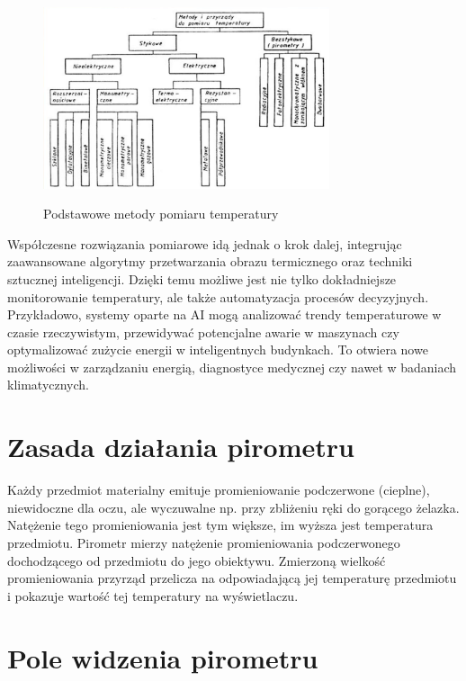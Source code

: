 \vspace{12pt}

\begin{figure}[h!]
    \centering
    \includegraphics[width=0.75\textwidth]{images/metody.png}
    \caption{Podstawowe metody pomiaru temperatury} \cite{1}
    \label{fig:metody}
\end{figure}


Współczesne rozwiązania pomiarowe idą jednak o krok dalej, integrując zaawansowane algorytmy przetwarzania obrazu termicznego oraz techniki sztucznej inteligencji. Dzięki temu możliwe jest nie tylko dokładniejsze monitorowanie temperatury, ale także automatyzacja procesów decyzyjnych. Przykładowo, systemy oparte na AI mogą analizować trendy temperaturowe w czasie rzeczywistym, przewidywać potencjalne awarie w maszynach czy optymalizować zużycie energii w inteligentnych budynkach. To otwiera nowe możliwości w zarządzaniu energią, diagnostyce medycznej czy nawet w badaniach klimatycznych.

\section*{Zasada działania pirometru}

Każdy przedmiot materialny emituje promieniowanie podczerwone (cieplne), niewidoczne dla oczu, ale wyczuwalne np. przy zbliżeniu ręki do gorącego żelazka. Natężenie tego promieniowania jest tym większe, im wyższa jest temperatura przedmiotu. Pirometr mierzy natężenie promieniowania podczerwonego dochodzącego od przedmiotu do jego obiektywu. Zmierzoną wielkość promieniowania przyrząd przelicza na odpowiadającą jej temperaturę przedmiotu i pokazuje wartość tej temperatury na wyświetlaczu.

\section*{Pole widzenia pirometru}

